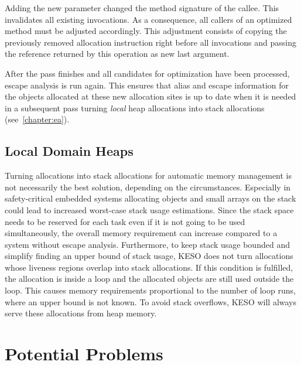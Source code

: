			Adding the new parameter changed the method signature of the callee. This invalidates all existing invocations. As
			a consequence, all callers of an optimized method must be adjusted accordingly. This adjustment consists of
			copying the previously removed allocation instruction right before all invocations and passing the reference
			returned by this operation as new last argument.

			After the pass finishes and all candidates for optimization have been processed, escape analysis is run again.
			This ensures that alias and escape information for the objects allocated at these new allocation sites is up to
			date when it is needed in a subsequent pass turning \emph{local} heap allocations into stack allocations
			(see~\cref{chapter:ea}).

		\subsection{Local Domain Heaps}
			\label{sub:eea:opt:ldh}
			Turning allocations into stack allocations for automatic memory management is not necessarily the best solution,
			depending on the circumstances. Especially in safety-critical embedded systems allocating objects and small arrays
			on the stack could lead to increased worst-case stack usage estimations. Since the stack space needs to be
			reserved for each task even if it is not going to be used simultaneously, the overall memory requirement can
			increase compared to a system without escape analysis. Furthermore, to keep stack usage bounded and simplify
			finding an upper bound of stack usage, KESO does not turn allocations whose liveness regions overlap into stack
			allocations. If this condition is fulfilled, the allocation is inside a loop and the allocated objects are still
			used outside the loop. This causes memory requirements proportional to the number of loop runs, where an upper
			bound is not known. To avoid stack overflows, KESO will always serve these allocations from heap memory.

	\section{Potential Problems}
		\label{sec:eea:probs}

